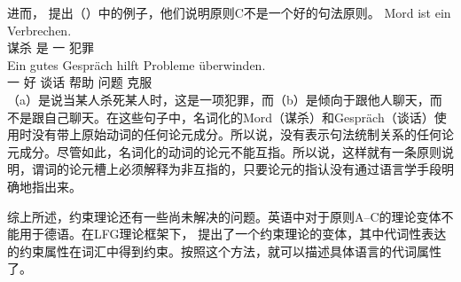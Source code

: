 进而， \citet[]{Fanselow92b}提出（）中的例子，他们说明原则C不是一个好的句法原则。
\eal
\ex 
\gll Mord ist ein Verbrechen.\\
     谋杀 是 一 犯罪\\
\ex 
\gll Ein gutes Gespräch hilft Probleme überwinden.\\
     一 好 谈话 帮助 问题 克服\\
\zl
（a）是说当某人杀死某人时，这是一项犯罪，而（b）是倾向于跟他人聊天，而不是跟自己聊天。在这些句子中，名词化的Mord（谋杀）和Gespräch（谈话）使用时没有带上原始动词的任何论元成分。所以说，没有表示句法统制关系的任何论元成分。尽管如此，名词化的动词的论元不能互指。所以说，这样就有一条原则说明，谓词的论元槽上必须解释为非互指的，只要论元的指认没有通过语言学手段明确地指出来。

综上所述，约束理论还有一些尚未解决的问题。英语中对于原则A--C的\hpsgc 理论变体不能用于德语\citep[\S~20]{Mueller99a}。在LFG理论框架下， \citet{Dalrymple93a}提出了一个约束理论的变体，其中代词性表达的约束属性在词汇中得到约束。按照这个方法，就可以描述具体语言的代词属性了。


